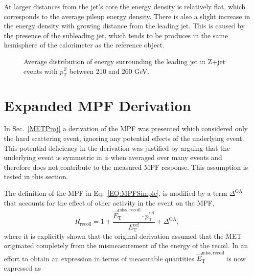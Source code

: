 At larger distances from the jet's core the energy density is relatively flat, which corresponds to the average pileup energy density.  
There is also a slight increase in the energy density with growing distance from the leading jet.  
This is caused by the presence of the subleading jet, which tends to be produces in the same hemisphere of the calorimeter as the reference object.  


\begin{figure}[!ht]
 \begin{center}
 \end{center}
 \caption[Recoil energy distribution in Z+jet, 210-260 GeV]
 {\small Average distribution of energy surrounding the leading jet in Z+jet events with $p_{\mathrm T}^{Z}$ between 210 and 260 GeV. }
 \label{Fig:EMShape210-260}
\end{figure}

\section{Expanded MPF Derivation}

In Sec.~\ref{METProj} a derivation of the MPF was presented which considered only the hard scattering event, ignoring any potential effects of the underlying event.  
This potential deficiency in the derivation was justified by arguing that the underlying event is symmetric in $\phi$ when averaged over many events and therefore does not contribute to the measured MPF response.  
This assumption is tested in this section.  

The definition of the MPF in Eq.~\ref{EQ:MPFSimple}, is modified by a term $\Delta^{\mathrm{OA}}$ that accounts for the effect of other activity in the event on the MPF, 
\begin{equation}
  \label{Eq:MPFWithDelta}
  R_{\mathrm{recoil}}=1+\frac{\vec{E}_{\mathrm T}^{\mathrm{miss, recoil}}\cdot\hat{p}_{\mathrm T}^{\mathrm{ref}}}{E_{\mathrm T}^{\mathrm{ref}}} + \Delta^{\mathrm{OA}}, 
\end{equation}
\noindent
where it is explicitly shown that the original derivation assumed that the MET originated completely from the mismeasurement of the energy of the recoil.  
In an effort to obtain an expression in terms of measurable quantities $\vec{E}_{\mathrm T}^{\mathrm{miss, recoil}}$ is now expressed as 

